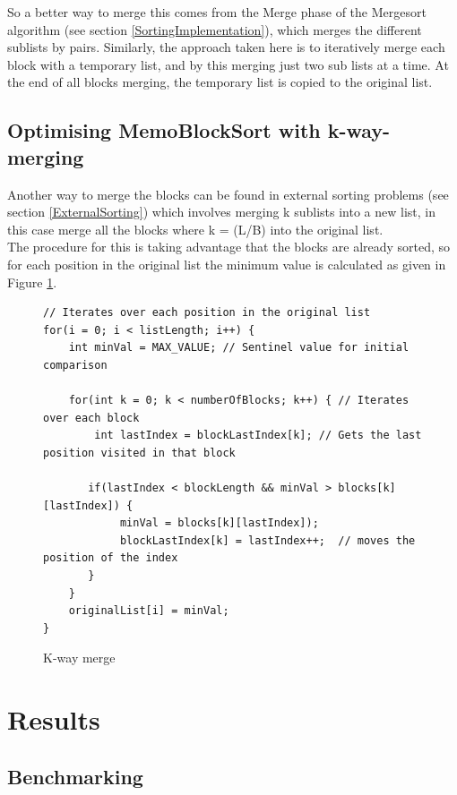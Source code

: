 \documentclass[a4paper,12pt]{article}
\begin{document}
So a better way to merge this comes from the Merge phase of the Mergesort algorithm (see section \ref{SortingImplementation}), which merges the different sublists by pairs. Similarly, the approach taken here is to iteratively merge each block with a temporary list, and by this merging just two sub lists at a time. At the end of all blocks merging, the temporary list is copied to the original list.

\subsection{Optimising MemoBlockSort with k-way-merging}
Another way to merge the blocks can be found in external sorting problems (see section \ref{ExternalSorting}) which involves merging k sublists into a new list, in this case merge all the blocks where k =  (L/B) into the original list.\\

The procedure for this is taking advantage that the blocks are already sorted, so for each position in the original list the minimum value is calculated as given in Figure \ref{kWayMerge}.

\begin{figure}[H]
\begin{small}
\begin{verbatim}
// Iterates over each position in the original list
for(i = 0; i < listLength; i++) {
    int minVal = MAX_VALUE; // Sentinel value for initial comparison

    for(int k = 0; k < numberOfBlocks; k++) { // Iterates over each block
        int lastIndex = blockLastIndex[k]; // Gets the last position visited in that block
		
       if(lastIndex < blockLength && minVal > blocks[k][lastIndex]) {
            minVal = blocks[k][lastIndex]);
            blockLastIndex[k] = lastIndex++;  // moves the position of the index
       }
    }
    originalList[i] = minVal;
}
\end{verbatim}
\end{small}
\caption{K-way merge}
\label{kWayMerge}
\end{figure}

\section{Results}

\subsection{Benchmarking}
\end{document}
